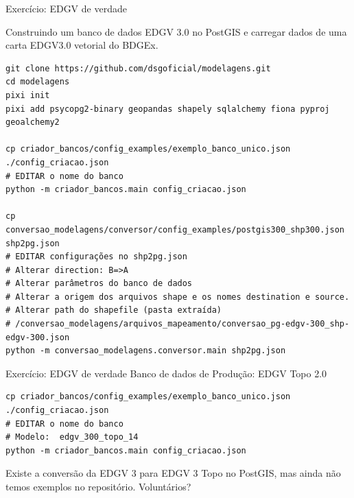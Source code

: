 \documentclass{beamer}
\begin{document}
\begin{frame}[fragile]{Exercício: EDGV de verdade}

Construindo um banco de dados EDGV 3.0 no PostGIS e carregar dados de uma carta EDGV3.0 vetorial do BDGEx.
\begin{verbatim}
git clone https://github.com/dsgoficial/modelagens.git
cd modelagens
pixi init
pixi add psycopg2-binary geopandas shapely sqlalchemy fiona pyproj geoalchemy2

cp criador_bancos/config_examples/exemplo_banco_unico.json ./config_criacao.json
# EDITAR o nome do banco
python -m criador_bancos.main config_criacao.json

cp conversao_modelagens/conversor/config_examples/postgis300_shp300.json shp2pg.json
# EDITAR configurações no shp2pg.json
# Alterar direction: B=>A
# Alterar parâmetros do banco de dados
# Alterar a origem dos arquivos shape e os nomes destination e source.
# Alterar path do shapefile (pasta extraída)
# /conversao_modelagens/arquivos_mapeamento/conversao_pg-edgv-300_shp-edgv-300.json
python -m conversao_modelagens.conversor.main shp2pg.json
\end{verbatim}

\end{frame}


\begin{frame}[fragile]{Exercício: EDGV de verdade}
Banco de dados de Produção: EDGV Topo 2.0



\begin{verbatim}
cp criador_bancos/config_examples/exemplo_banco_unico.json ./config_criacao.json
# EDITAR o nome do banco
# Modelo:  edgv_300_topo_14
python -m criador_bancos.main config_criacao.json
\end{verbatim}
Existe a conversão da EDGV 3 para EDGV 3 Topo no PostGIS, mas ainda não temos exemplos no repositório. Voluntários?
\end{frame}
\end{document}

